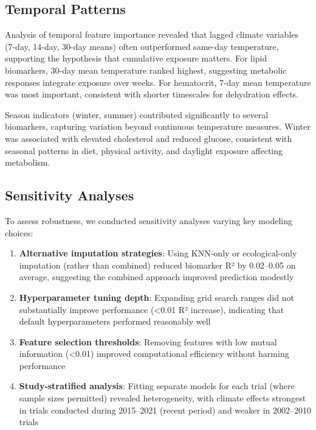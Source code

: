 \subsection{Temporal Patterns}

Analysis of temporal feature importance revealed that lagged climate variables (7-day, 14-day, 30-day means) often outperformed same-day temperature, supporting the hypothesis that cumulative exposure matters. For lipid biomarkers, 30-day mean temperature ranked highest, suggesting metabolic responses integrate exposure over weeks. For hematocrit, 7-day mean temperature was most important, consistent with shorter timescales for dehydration effects.

Season indicators (winter, summer) contributed significantly to several biomarkers, capturing variation beyond continuous temperature measures. Winter was associated with elevated cholesterol and reduced glucose, consistent with seasonal patterns in diet, physical activity, and daylight exposure affecting metabolism.

\subsection{Sensitivity Analyses}

To assess robustness, we conducted sensitivity analyses varying key modeling choices:

\begin{enumerate}
    \item \textbf{Alternative imputation strategies}: Using KNN-only or ecological-only imputation (rather than combined) reduced biomarker R² by 0.02--0.05 on average, suggesting the combined approach improved prediction modestly

    \item \textbf{Hyperparameter tuning depth}: Expanding grid search ranges did not substantially improve performance (<0.01 R² increase), indicating that default hyperparameters performed reasonably well

    \item \textbf{Feature selection thresholds}: Removing features with low mutual information (<0.01) improved computational efficiency without harming performance

    \item \textbf{Study-stratified analysis}: Fitting separate models for each trial (where sample sizes permitted) revealed heterogeneity, with climate effects strongest in trials conducted during 2015--2021 (recent period) and weaker in 2002--2010 trials
\end{enumerate}

